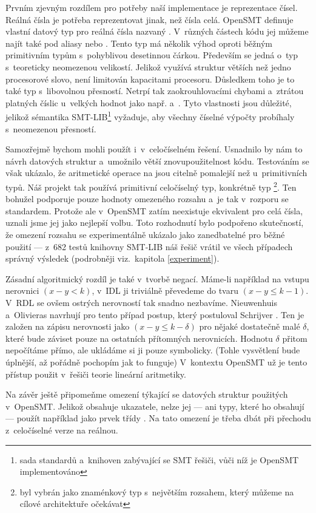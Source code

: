 Prvním zjevným rozdílem pro potřeby naší implementace je reprezentace čísel. Reálná čísla je potřeba reprezentovat jinak, než čísla celá. OpenSMT definuje vlastní datový typ pro reálná čísla nazvaný . V~různých částech kódu jej můžeme najít také pod aliasy  nebo . Tento typ má několik výhod oproti běžným primitivním typům s~pohyblivou desetinnou čárkou. Především se jedná o~typ s~teoreticky neomezenou velikostí. Jelikož využívá struktur větších než jedno procesorové slovo, není limitován kapacitami procesoru. Důsledkem toho je to také typ s~libovolnou přesností. Netrpí tak zaokrouhlovacími chybami a~ztrátou platných číslic u~velkých hodnot jako např.  a~. Tyto vlastnosti jsou důležité, jelikož sémantika SMT-LIB\footnote{sada standardů a~knihoven zabývající se SMT řešiči, vůči níž je OpenSMT implementováno} vyžaduje, aby všechny číselné výpočty probíhaly s~neomezenou přesností.

Samozřejmě bychom mohli  použít i~v~celočíselném řešení. Usnadnilo by nám to návrh datových struktur a~umožnilo větší znovupoužitelnost kódu. Testováním se však ukázalo, že aritmetické operace na  jsou citelně pomalejší než u~primitivních typů. Náš projekt tak používá primitivní celočíselný typ, konkrétně typ \footnote{ byl vybrán jako znaménkový typ s~největším rozsahem, který můžeme na cílové architektuře očekávat}. Ten bohužel podporuje pouze hodnoty omezeného rozsahu a~je tak v~rozporu se standardem. Protože ale v~OpenSMT zatím neexistuje ekvivalent  pro celá čísla, uznali jsme jej jako nejlepší volbu. Toto rozhodnutí bylo podpořeno skutečností, že omezení rozsahu se experimentálně ukázalo jako zanedbatelné pro běžné použití --- z~682 testů knihovny SMT-LIB náš řešič vrátil ve všech případech správný výsledek (podrobněji viz.~kapitola \ref{experiment}).

Zásadní algoritmický rozdíl je také v~tvorbě negací. Máme-li například na vstupu nerovnici $(x-y<k)$, v~IDL ji triviálně převedeme do tvaru $(x-y\leq k-1)$. V~RDL se ovšem ostrých nerovností tak snadno nezbavíme. Nieuwenhuis a~Olivieras \cite{Nieuwenhuis05} navrhují pro tento případ postup, který postuloval Schrijver \cite{Schrijver86}. Ten je založen na zápisu nerovnosti jako $(x-y\leq k-\delta)$ pro nějaké dostatečně malé $\delta$, které bude záviset pouze na ostatních přítomných nerovnicích. Hodnotu $\delta$ přitom nepočítáme přímo, ale ukládáme si ji pouze symbolicky. (Tohle vysvětlení bude úplnější, až pořádně pochopím jak to funguje) %
V~kontextu OpenSMT už je tento přístup použit v~řešiči teorie lineární aritmetiky.

Na závěr ještě připomeňme omezení týkající se datových struktur použitých v~OpenSMT. Jelikož  obsahuje ukazatele, nelze jej --- ani typy, které ho obsahují --- použít například jako prvek třídy . Na tato omezení je třeba dbát při přechodu z~celočíselné verze na reálnou.
